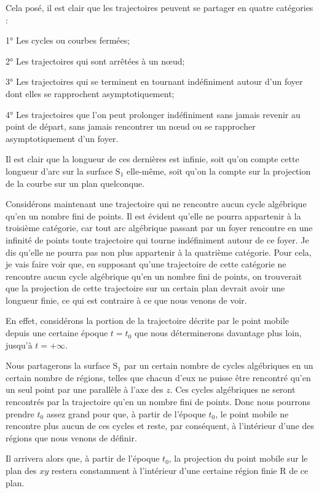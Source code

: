 \documentclass[11pt]{article}
\begin{document}
Cela posé, il est clair que les trajectoires peuvent se partager en quatre catégories :

1° Les cycles ou courbes fermées;

2° Les trajectoires qui sont arrêtées à un nœud;

3° Les trajectoires qui se terminent en tournant indéfiniment autour d’un foyer dont elles se rapprochent asymptotiquement;

4° Les trajectoires que l’on peut prolonger indéfiniment sans jamais revenir au point de départ, sans jamais rencontrer un nœud ou se rapprocher asymptotiquement d’un foyer.

Il est clair que la longueur de ces dernières est infinie, soit qu’on compte cette longueur d’arc sur la surface $\mathrm{S}_1$ elle-même, soit qu’on la compte sur la projection de la courbe sur un plan quelconque.

Considérons maintenant une trajectoire qui ne rencontre aucun cycle algébrique qu’en un nombre fini de points. Il est évident qu’elle ne pourra appartenir à la troisième catégorie, car tout arc algébrique passant par un foyer rencontre en une infinité de points toute trajectoire qui tourne indéfiniment autour de ce foyer. Je dis qu’elle ne pourra pas non plus appartenir à la quatrième catégorie. Pour cela, je vais faire voir que, en supposant qu’une trajectoire de cette catégorie ne rencontre aucun cycle algébrique qu’en un nombre fini de points, on trouverait que la projection de cette trajectoire sur un certain plan devrait avoir une longueur finie, ce qui est contraire à ce que nous venons de voir.

En effet, considérons la portion de la trajectoire décrite par le point mobile depuis une certaine époque $t=t_0$ que nous déterminerons davantage plus loin, jusqu’à $t=+\infty$.

Nous partagerons la surface $\mathrm{S}_1$ par un certain nombre de cycles algébriques en un certain nombre de régions, telles que chacun d’eux ne puisse être rencontré qu’en un seul point par une parallèle à l’axe des $z$. Ces cycles algébriques ne seront rencontrés par la trajectoire qu’en un nombre fini de points. Donc nous pourrons prendre $t_0$ assez grand pour que, à partir de l’époque $t_0$, le point mobile ne rencontre plus aucun de ces cycles et reste, par conséquent, à l’intérieur d’une des régions que nous venons de définir.

Il arrivera alors que, à partir de l’époque $t_0$, la projection du point mobile sur le plan des $xy$ restera constamment à l’intérieur d’une certaine région finie R de ce plan.
\end{document}
